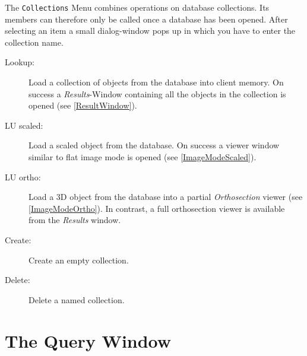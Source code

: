 \documentclass[11pt]{article}
\begin{document}
The \texttt{Collections} Menu combines operations on database collections. Its
members can therefore only be called once a database has been opened. After
selecting an item a small dialog-window pops up in which you have to enter
the collection name.

\begin{description}

\item[Lookup:] Load a collection of objects from the database into client
memory. On success a \emph{Results}-Window containing all the objects
in the collection is opened (see \ref{ResultWindow}).

\item[LU scaled:] Load a scaled object from the database. On success a viewer
window similar to flat image mode is opened (see \ref{ImageModeScaled}).

\item[LU ortho:] Load a 3D object from the database into a partial
\emph{Orthosection} viewer (see \ref{ImageModeOrtho}). In contrast, a
full orthosection viewer is available from the \emph{Results} window.

\item[Create:] Create an empty collection.

\item[Delete:] Delete a named collection.

\end{description}


\section{The Query Window}
\label{QueryWindow}
\end{document}
